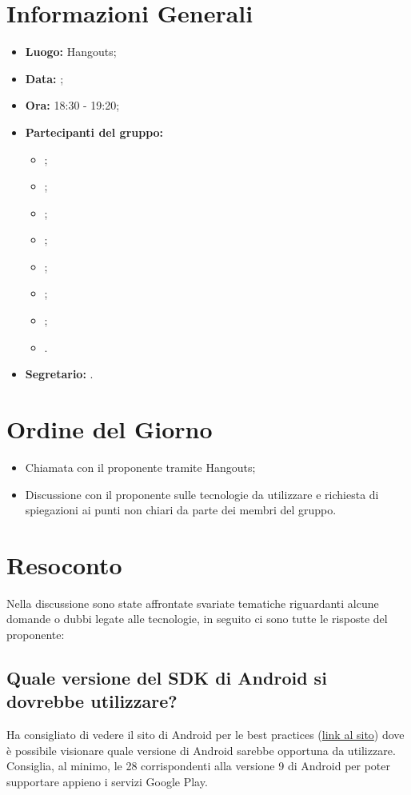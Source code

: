 \section{Informazioni Generali}
\begin{itemize}
\item \textbf{Luogo:} Hangouts;
\item \textbf{Data:} \Data;
\item \textbf{Ora:} 18:30 - 19:20;
\item \textbf{Partecipanti del gruppo:}
	\begin{itemize}
	\item \AT{}; 
	\item \CE{}; 
	\item \DF{};
	\item \LD{};
	\item \PF{};
	\item \SE{};
	\item \BR{};
	\item \MC{}.
	\end{itemize} 
\item \textbf{Segretario:} \MC{}.
\end{itemize}


\section{Ordine del Giorno}
\begin{itemize}
	\item Chiamata con il proponente tramite Hangouts;
	\item Discussione con il proponente sulle tecnologie da utilizzare e richiesta di spiegazioni ai punti non chiari da parte dei membri del gruppo.
\end{itemize}

\section{Resoconto}
Nella discussione sono state affrontate svariate tematiche riguardanti alcune domande o dubbi legate alle tecnologie, in seguito ci sono tutte le risposte del proponente:

\subsection{Quale versione del SDK di Android si dovrebbe utilizzare?}
Ha consigliato di vedere il sito di Android per le best practices (\href{https://developer.android.com/distribute/best-practices}{link al sito}) dove è possibile visionare quale versione  di Android sarebbe opportuna da utilizzare. 
Consiglia, al minimo, le  28 corrispondenti alla versione 9 di Android per poter supportare appieno i servizi Google Play.

